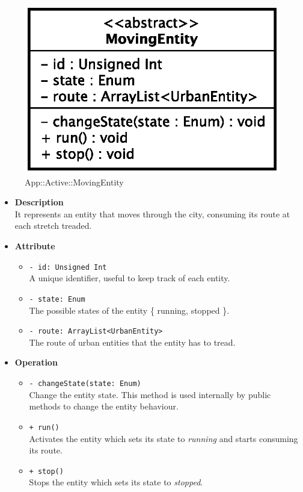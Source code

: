 \begin{figure}[h]
\centering
\includegraphics[scale=0.6,keepaspectratio]{images/solution/moving_entity.eps}
\caption{App::Active::MovingEntity}
\label{fig:sd-app-movingentity}
\end{figure}
\begin{itemize}
  \item \textbf{Description} \\
    It represents an entity that moves through the city, consuming its 
route at each stretch treaded.
  \item \textbf{Attribute}
  \begin{itemize}
    \item \texttt{- id: Unsigned Int} \\
A unique identifier, useful to keep track of each entity.
    \item \texttt{- state: Enum} \\
The possible states of the entity \{ running, stopped \}.
    \item \texttt{- route: ArrayList<UrbanEntity>} \\
The route of urban entities that the entity has to tread.
  \end{itemize}
  \item \textbf{Operation}
  \begin{itemize}
    \item \texttt{- changeState(state: Enum)} \\
Change the entity state. This method is used internally by public methods to 
change the entity behaviour.
    \item  \texttt{+ run()} \\
Activates the entity which sets its state to \textit{running} and 
starts consuming its route.
    \item  \texttt{+ stop()} \\
Stops the entity which sets its state to \textit{stopped}.
  \end{itemize}
\end{itemize}
